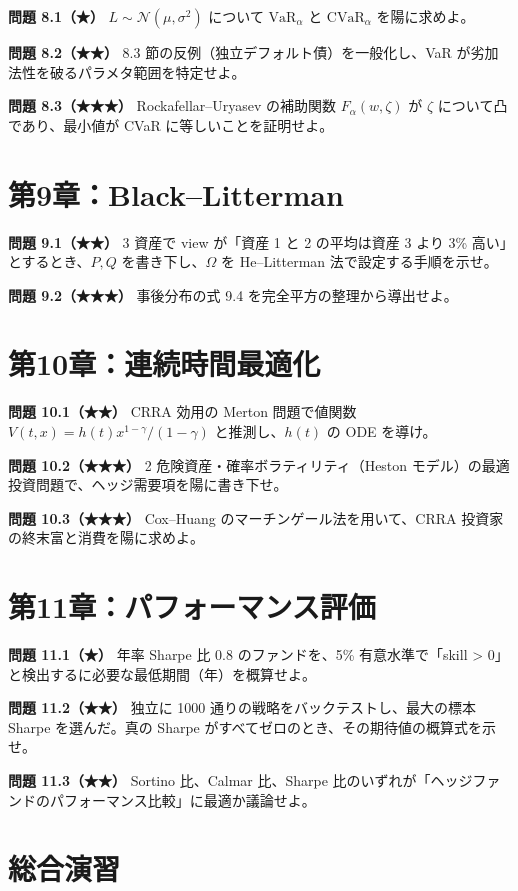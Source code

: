 \documentclass[11pt,a4paper]{report}
\begin{document}
\textbf{問題 8.1（★）} $L \sim \mathcal{N}(\mu, \sigma^2)$ について $\mathrm{VaR}_\alpha$ と $\mathrm{CVaR}_\alpha$ を陽に求めよ。

\textbf{問題 8.2（★★）} 8.3 節の反例（独立デフォルト債）を一般化し、VaR が劣加法性を破るパラメタ範囲を特定せよ。

\textbf{問題 8.3（★★★）} Rockafellar–Uryasev の補助関数 $F_\alpha(w, \zeta)$ が $\zeta$ について凸であり、最小値が CVaR に等しいことを証明せよ。

\section{第9章：Black–Litterman}

\textbf{問題 9.1（★★）} 3 資産で view が「資産 1 と 2 の平均は資産 3 より 3\% 高い」とするとき、$P, Q$ を書き下し、$\Omega$ を He–Litterman 法で設定する手順を示せ。

\textbf{問題 9.2（★★★）} 事後分布の式 9.4 を完全平方の整理から導出せよ。

\section{第10章：連続時間最適化}

\textbf{問題 10.1（★★）} CRRA 効用の Merton 問題で値関数 $V(t, x) = h(t) x^{1-\gamma}/(1-\gamma)$ と推測し、$h(t)$ の ODE を導け。

\textbf{問題 10.2（★★★）} 2 危険資産・確率ボラティリティ（Heston モデル）の最適投資問題で、ヘッジ需要項を陽に書き下せ。

\textbf{問題 10.3（★★★）} Cox–Huang のマーチンゲール法を用いて、CRRA 投資家の終末富と消費を陽に求めよ。

\section{第11章：パフォーマンス評価}

\textbf{問題 11.1（★）} 年率 Sharpe 比 0.8 のファンドを、5\% 有意水準で「skill > 0」と検出するに必要な最低期間（年）を概算せよ。

\textbf{問題 11.2（★★）} 独立に 1000 通りの戦略をバックテストし、最大の標本 Sharpe を選んだ。真の Sharpe がすべてゼロのとき、その期待値の概算式を示せ。

\textbf{問題 11.3（★★）} Sortino 比、Calmar 比、Sharpe 比のいずれが「ヘッジファンドのパフォーマンス比較」に最適か議論せよ。

\section{総合演習}
\end{document}
